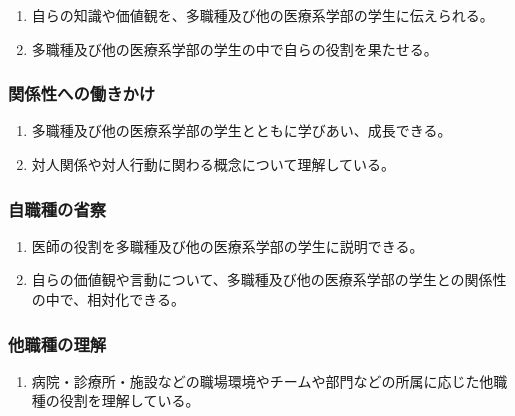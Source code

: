\begin{enumerate}
\def\labelenumi{\arabic{enumi}.}
\tightlist
\item
  自らの知識や価値観を、多職種及び他の医療系学部の学生に伝えられる。
\item
  多職種及び他の医療系学部の学生の中で自らの役割を果たせる。
\end{enumerate}

\hypertarget{ux95a2ux4fc2ux6027ux3078ux306eux50cdux304dux304bux3051}{%
\subsubsection{関係性への働きかけ}\label{ux95a2ux4fc2ux6027ux3078ux306eux50cdux304dux304bux3051}}

\begin{enumerate}
\def\labelenumi{\arabic{enumi}.}
\tightlist
\item
  多職種及び他の医療系学部の学生とともに学びあい、成長できる。
\item
  対人関係や対人行動に関わる概念について理解している。
\end{enumerate}

\hypertarget{ux81eaux8077ux7a2eux306eux7701ux5bdf}{%
\subsubsection{自職種の省察}\label{ux81eaux8077ux7a2eux306eux7701ux5bdf}}

\begin{enumerate}
\def\labelenumi{\arabic{enumi}.}
\tightlist
\item
  医師の役割を多職種及び他の医療系学部の学生に説明できる。
\item
  自らの価値観や言動について、多職種及び他の医療系学部の学生との関係性の中で、相対化できる。
\end{enumerate}

\hypertarget{ux4ed6ux8077ux7a2eux306eux7406ux89e3}{%
\subsubsection{他職種の理解}\label{ux4ed6ux8077ux7a2eux306eux7406ux89e3}}

\begin{enumerate}
\def\labelenumi{\arabic{enumi}.}
\tightlist
\item
  病院・診療所・施設などの職場環境やチームや部門などの所属に応じた他職種の役割を理解している。
\end{enumerate}

